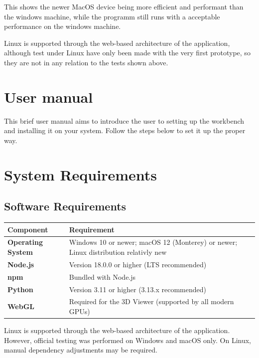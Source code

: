 \documentclass[a4paper,12pt]{article}
\begin{document}
This shows the newer MacOS device being more efficient and performant than the windows machine, while the programm still runs with a acceptable performance on the windows machine. 

\begin{notebox}
Linux is supported through the web-based architecture of the application, although test under Linux have only been made with the very first prototype, so they are not in any relation to the tests shown above. 
\end{notebox}

\newpage
\section{User manual}
This brief user manual aims to introduce the user to setting up the workbench and installing it on your system. Follow the steps below to set it up the proper way. 
\section{System Requirements}
 
\subsection{Software Requirements}
 
\begin{center}
\begin{tabular}{>{\bfseries}p{4cm} p{9cm}}
\toprule
Component & Requirement \\
\midrule
Operating System   & Windows 10 or newer; macOS 12 (Monterey) or newer; Linux distribution relativly new \\
Node.js            & Version 18.0.0 or higher (LTS recommended) \\
npm                & Bundled with Node.js \\
Python             & Version 3.11 or higher (3.13.x recommended) \\
WebGL              & Required for the 3D Viewer (supported by all modern GPUs) \\
\bottomrule
\end{tabular}
\end{center}
 
\begin{notebox}
Linux is supported through the web-based architecture of the application. However, official testing was performed on Windows and macOS only. On Linux, manual dependency adjustments may be required.
\end{notebox}
 
\end{document}
